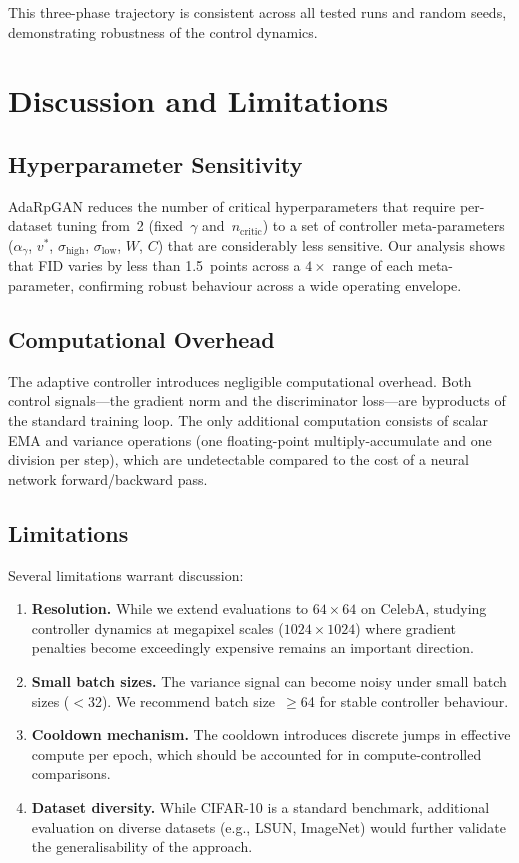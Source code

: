 \documentclass[journal]{IEEEtran}
\newcommand{\vtarget}{v^{*}}
\newcommand{\ncritic}{n_{\mathrm{critic}}}
\begin{document}
This three-phase trajectory is consistent across all tested runs and random seeds, demonstrating robustness of the control dynamics.

\section{Discussion and Limitations}
\label{sec:discussion}

\subsection{Hyperparameter Sensitivity}

AdaRpGAN reduces the number of critical hyperparameters that require per-dataset tuning from~2 (fixed~$\gamma$ and~$\ncritic$) to a set of controller meta-parameters ($\alpha_\gamma$, $\vtarget$, $\sigma_{\mathrm{high}}$, $\sigma_{\mathrm{low}}$, $W$, $C$) that are considerably less sensitive. Our analysis shows that FID varies by less than 1.5~points across a $4{\times}$ range of each meta-parameter, confirming robust behaviour across a wide operating envelope.

\subsection{Computational Overhead}

The adaptive controller introduces negligible computational overhead. Both control signals---the gradient norm and the discriminator loss---are byproducts of the standard training loop. The only additional computation consists of scalar EMA and variance operations (one floating-point multiply-accumulate and one division per step), which are undetectable compared to the cost of a neural network forward/backward pass.

\subsection{Limitations}

Several limitations warrant discussion:

\begin{enumerate}
    \item \textbf{Resolution.} While we extend evaluations to $64{\times}64$ on CelebA, studying controller dynamics at megapixel scales ($1024{\times}1024$) where gradient penalties become exceedingly expensive remains an important direction.
    \item \textbf{Small batch sizes.} The variance signal can become noisy under small batch sizes ($<$32). We recommend batch size~$\geq$64 for stable controller behaviour.
    \item \textbf{Cooldown mechanism.} The cooldown introduces discrete jumps in effective compute per epoch, which should be accounted for in compute-controlled comparisons.
    \item \textbf{Dataset diversity.} While CIFAR-10 is a standard benchmark, additional evaluation on diverse datasets (e.g., LSUN, ImageNet) would further validate the generalisability of the approach.
\end{enumerate}
\end{document}
